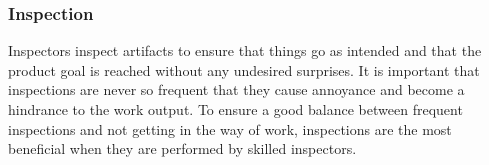 \subsubsection{Inspection}


Inspectors inspect artifacts to ensure that things go as intended and that the product goal 
is reached without any undesired surprises\cite{scrumguide11}. It is important that 
inspections are never so frequent that they cause annoyance and become a hindrance to the
work output\cite{scrumguide11}. To ensure a good balance between frequent inspections and 
not getting in the way of work, inspections are the most beneficial when they are performed 
by skilled inspectors\cite{scrumguide11}.